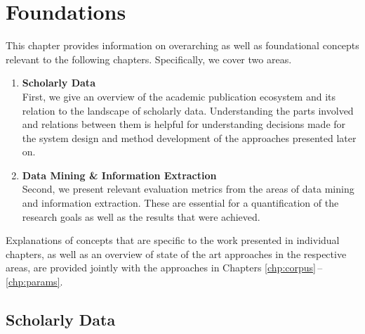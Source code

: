 \chapter{Foundations}
\label{chp:foundations}

This chapter provides information on overarching as well as foundational concepts relevant to the following chapters. Specifically, we cover two areas.

\begin{enumerate}
    \item \textbf{Scholarly Data}\\
        First, we give an overview of the academic publication ecosystem and its relation to the landscape of scholarly data. Understanding the parts involved and relations between them is helpful for understanding decisions made for the system design and method development of the approaches presented later on.
    \item \textbf{Data Mining \& Information Extraction}\\
        Second, we present relevant evaluation metrics from the areas of data mining and information extraction. These are essential for a quantification of the research goals as well as the results that were achieved.
\end{enumerate}

Explanations of concepts that are specific to the work presented in individual chapters, as well as an overview of state of the art approaches in the respective areas, are provided jointly with the approaches in Chapters \ref{chp:corpus}\,--\,\ref{chp:params}.

\section{Scholarly Data}



